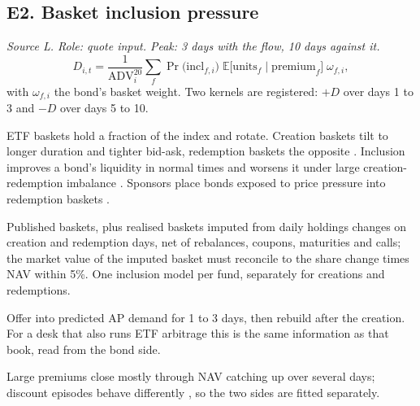 \documentclass[11pt,letterpaper]{article}
\newcommand{\E}{\mathbb{E}}
\newcommand{\ADV}{\mathrm{ADV}}
\begin{document}
\subsection{E2. Basket inclusion pressure}
\emph{Source L. Role: quote input. Peak: 3 days with the flow, 10 days against it.}
\begin{equation}
D_{i,t}=\frac{1}{\ADV^{20}_i}\sum_{f}\Pr\bigl(\mathrm{incl}_{f,i}\bigr)\;\E\bigl[\mathrm{units}_f\mid\mathrm{premium}_f\bigr]\;\omega_{f,i},
\end{equation}
with $\omega_{f,i}$ the bond's basket weight. Two kernels are registered: $+D$ over days 1 to 3 and $-D$ over days 5 to 10.
\begin{spec}
\item[Mechanism and evidence.] ETF baskets hold a fraction of the index and rotate. Creation baskets tilt to longer duration and tighter bid-ask, redemption baskets the opposite \cite{st}. Inclusion improves a bond's liquidity in normal times and worsens it under large creation-redemption imbalance \cite{kmpz}. Sponsors place bonds exposed to price pressure into redemption baskets \cite{xiao}.
\item[Build.] Published baskets, plus realised baskets imputed from daily holdings changes on creation and redemption days, net of rebalances, coupons, maturities and calls; the market value of the imputed basket must reconcile to the share change times NAV within 5\%. One inclusion model per fund, separately for creations and redemptions.
\item[Role in the quote.] Offer into predicted AP demand for 1 to 3 days, then rebuild after the creation. For a desk that also runs ETF arbitrage this is the same information as that book, read from the bond side.
\item[Decay and pitfalls.] Large premiums close mostly through NAV catching up over several days; discount episodes behave differently \cite{st}, so the two sides are fitted separately.
\end{spec}
\end{document}
